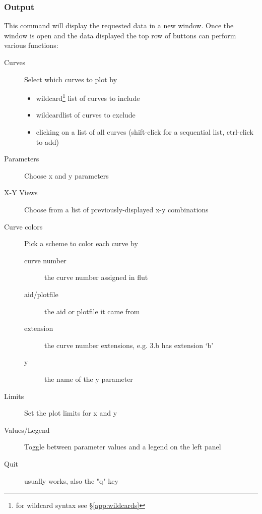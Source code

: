 \documentclass[11pt,openany,twoside]{book}
\numberwithin{equation}{section}		%
\newcommand{\Cmd}[1]{{\sf #1}}
\newcommand{\Sectref}[1]{\S\ref{#1}}
\begin{document}
\subsubsection{Output}
This command will display the requested data in a new
window. Once the window is open and the data displayed
the top row of buttons can perform various functions:
\begin{description}
	\item[Curves] Select which curves to plot by
		\begin{itemize}
			\item wildcard\footnote[1]{for wildcard syntax see \Sectref{app:wildcards}}
			list of curves to include
			\item wildcard\footnotemark[1] list of curves to exclude
			\item clicking on a list of all curves (shift-click for a
				sequential list, ctrl-click to add)
		\end{itemize}
	\item[Parameters] Choose x and y parameters
	\item[X-Y Views] Choose from a list of previously-displayed x-y combinations
	\item[Curve colors] Pick a scheme to color each curve by
		\begin{description}
			\item[curve number] the curve number assigned in \Cmd{flut}
			\item[aid/plotfile] the aid or plotfile it came from
			\item[extension] the curve number extensions, e.g. 3.b has extension `b'
			\item[y] the name of the y parameter
		\end{description}
	\item[Limits] Set the plot limits for x and y
	\item[Values/Legend] Toggle between parameter values and a legend on the
		left panel
	\item[Quit] usually works, also the "q" key
\end{description}
\end{document}
